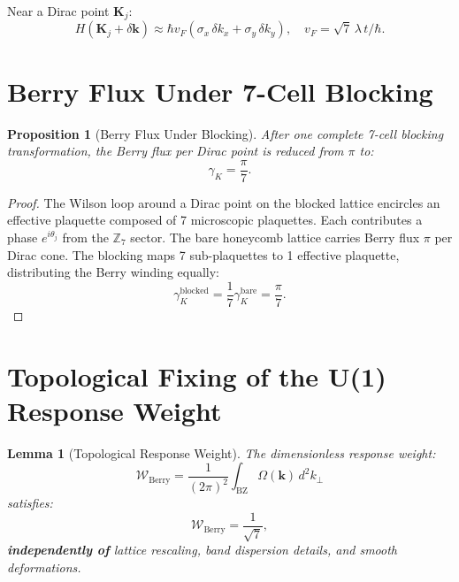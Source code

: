 \documentclass[11pt,letterpaper]{article}
\newtheorem{lemma}[theorem]{Lemma}
\newtheorem{proposition}[theorem]{Proposition}
\begin{document}
Near a Dirac point $\mathbf{K}_j$:
\begin{equation}
  H(\mathbf{K}_j + \delta\mathbf{k})
  \approx \hbar v_F(\sigma_x\,\delta k_x + \sigma_y\,\delta k_y),
  \quad
  v_F = \sqrt{7}\,\lambda\,t/\hbar.
\end{equation}

\section{Berry Flux Under 7-Cell Blocking}

\begin{proposition}[Berry Flux Under Blocking]
After one complete 7-cell blocking transformation, the Berry flux per
Dirac point is reduced from $\pi$ to:
\begin{equation}
  \gamma_K = \frac{\pi}{7}.
\end{equation}
\end{proposition}

\begin{proof}
The Wilson loop around a Dirac point on the blocked lattice encircles an
effective plaquette composed of 7 microscopic plaquettes.  Each contributes
a phase $e^{i\theta_j}$ from the $\mathbb{Z}_7$ sector.  The bare honeycomb
lattice carries Berry flux $\pi$ per Dirac cone.  The blocking maps 7
sub-plaquettes to 1 effective plaquette, distributing the Berry winding
equally:
\begin{equation}
  \gamma_K^\mathrm{blocked} = \frac{1}{7}\gamma_K^\mathrm{bare} = \frac{\pi}{7}.
\end{equation}
\end{proof}

\section{Topological Fixing of the U(1) Response Weight}

\begin{lemma}[Topological Response Weight]
The dimensionless response weight:
\begin{equation}
  \mathcal{W}_\mathrm{Berry} = \frac{1}{(2\pi)^2}
  \int_\mathrm{BZ}\Omega(\mathbf{k})\,d^2k_\perp
\end{equation}
satisfies:
\begin{equation}
  \boxed{\mathcal{W}_\mathrm{Berry} = \frac{1}{\sqrt{7}},}
\end{equation}
\textbf{independently of} lattice rescaling, band dispersion details,
and smooth deformations.
\end{lemma}
\end{document}
